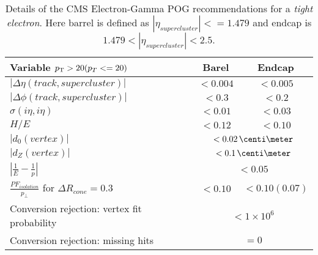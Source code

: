 \begin{table}[!htp]
\centering
\begin{tabular}{|l|c|c|}
\hline
Variable  $p_{\mathrm{T}} > 20 (p_{T} <= 20)$ & Barel & Endcap \\
\hline\hline
$| \Delta\eta(track,supercluster) |$                           & $<0.004$ & $<0.005$ \\
$| \Delta\phi(track,supercluster) |$                           & $<0.3  $ & $<0.2  $ \\
$ \sigma(i\eta,i\eta)$                                         & $<0.01 $ & $<0.03 $ \\
$H/E$                                                          & $<0.12 $ & $<0.10 $ \\
\cline{2-3}
$|d_{0}(vertex)|$                                              & \multicolumn{2}{c|}{$<0.02\,\centi\meter$} \\
$|d_{Z}(vertex)|$                                              & \multicolumn{2}{c|}{$<0.1\,\centi\meter$}  \\
$|\frac{1}{E}-\frac{1}{p}| $                                   & \multicolumn{2}{c|}{$<0.05$} \\
\cline{2-3}
$\frac{PF_{isolation}}{p_{\perp}}$ for $ \Delta R_{cone}=0.3$ & $<0.10 $ & $<0.10(0.07)$ \\
\cline{2-3}
Conversion rejection: vertex fit probability                   & \multicolumn{2}{c|}{$<1 \times 10^{6}$}  \\
Conversion rejection: missing hits                             & \multicolumn{2}{c|}{$=0$} \\
\hline
\end{tabular}
\caption[Details of the CMS Electron-Gamma POG recommendations for a \textit{tight electron}.]
{Details of the CMS Electron-Gamma POG recommendations for a \textit{tight electron}. Here barrel is defined as $ |\eta_{supercluster}|<=1.479 $ and endcap is $ 1.479 < |\eta_{supercluster}| < 2.5 $.}
\label{TABLE:PhysicsObjects_ElectronPOG_CutBased_TightElectronRequirements}
\end{table}

